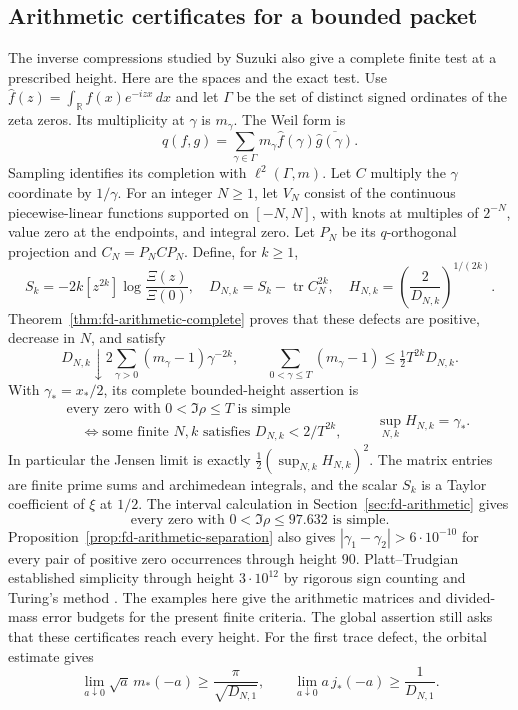 \subsection{Arithmetic certificates for a bounded packet}
The inverse compressions studied by Suzuki also give a complete finite
test at a prescribed height. Here are the spaces and the exact test.
Use $\widehat f(z)=\int_{\mathbb R}f(x)e^{-izx}\,dx$ and let
$\Gamma$ be the set of distinct signed ordinates of the zeta zeros.
Its multiplicity at $\gamma$ is $m_\gamma$. The Weil form is
\[
 q(f,g)=\sum_{\gamma\in\Gamma}
 m_\gamma\widehat f(\gamma)\overline{\widehat g(\gamma)}.
\]
Sampling identifies its completion with $\ell^2(\Gamma,m)$.
Let $C$ multiply the $\gamma$ coordinate by $1/\gamma$.
For an integer $N\ge1$, let $V_N$ consist of the continuous
piecewise-linear functions supported on $[-N,N]$, with knots
at multiples of $2^{-N}$, value zero at the endpoints, and integral
zero. Let $P_N$ be its $q$-orthogonal projection and $C_N=P_NCP_N$.
Define, for $k\ge1$,
\[
 S_k=-2k[z^{2k}]\log\frac{\Xi(z)}{\Xi(0)},\quad
 D_{N,k}=S_k-\operatorname{tr}C_N^{2k},\quad
 H_{N,k}=\left(\frac2{D_{N,k}}\right)^{1/(2k)}.
\]
Theorem~\ref{thm:fd-arithmetic-complete} proves that these defects
are positive, decrease in $N$, and satisfy
\[
 D_{N,k}\downarrow2\sum_{\gamma>0}(m_\gamma-1)\gamma^{-2k},
 \qquad
 \sum_{0<\gamma\le T}(m_\gamma-1)\le\tfrac12T^{2k}D_{N,k}.
\]
With $\gamma_*=x_*/2$, its complete bounded-height assertion is
\[
 \begin{split}
 &\text{every zero with }0<\Im\rho\le T\text{ is simple}\\
 &\quad\Longleftrightarrow
   \text{some finite }N,k\text{ satisfies }D_{N,k}<2/T^{2k},
 \end{split}
 \qquad
 \sup_{N,k}H_{N,k}=\gamma_*.
\]
In particular the Jensen limit is exactly
$\tfrac12(\sup_{N,k}H_{N,k})^2$.
The matrix entries are finite prime sums and archimedean integrals,
and the scalar $S_k$ is a Taylor coefficient of $\xi$ at $1/2$.
The interval calculation in Section~\ref{sec:fd-arithmetic} gives
\[
       \text{every zero with }0<\Im\rho\le97.632
       \text{ is simple}.
\]
Proposition~\ref{prop:fd-arithmetic-separation} also gives
$|\gamma_1-\gamma_2|>6\cdot10^{-10}$ for every pair of positive
zero occurrences through height $90$.
Platt--Trudgian established simplicity through height
$3\cdot10^{12}$ by rigorous sign counting and Turing's method
\cite[abstract, p.~792; preprint Section~2, pp.~2--3]{platt-trudgian2021}.
The examples here give the arithmetic matrices and divided-mass error
budgets for the present finite criteria.
The global assertion still asks that these certificates reach every
height. For the first trace defect, the orbital estimate gives
\[
 \lim_{a\downarrow0}\sqrt a\,m_*(-a)
       \ge\frac{\pi}{\sqrt{D_{N,1}}},\qquad
 \lim_{a\downarrow0}a\,j_*(-a)\ge\frac1{D_{N,1}}.
\]

